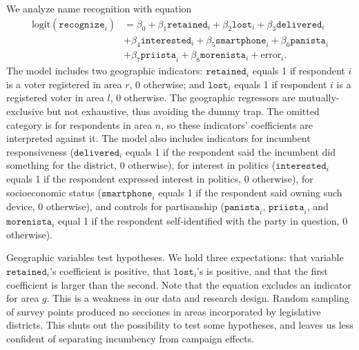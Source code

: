 \documentclass[letter,12pt]{article}
\begin{document}
We analyze name recognition with equation
\begin{equation}
  \begin{split}
\text{logit}(\texttt{recognize}_i) & =    \beta_0
                                       + \beta_1\texttt{retained}_i
                                       + \beta_2\texttt{lost}_i
                                       + \beta_3\texttt{delivered}_i \\
                                     & + \beta_4\texttt{interested}_i
                                       + \beta_5\texttt{smartphone}_i 
                                       + \beta_6\texttt{panista}_i \\
                                     & + \beta_7\texttt{priista}_i
                                       + \beta_8\texttt{morenista}_i
                                       + \text{error}_i.
  \end{split}
\end{equation}
The model includes two geographic indicators: $\texttt{retained}_i$ equals 1 if respondent $i$ is a voter registered in area $r$, 0 otherwise; and $\texttt{lost}_i$ equals 1 if respondent $i$ is a registered voter in area $l$, 0 otherwise. The geographic regressors are mutually-exclusive but not exhaustive, thus avoiding the dummy trap. The omitted category is for respondents in area $n$, so these indicators' coefficients are interpreted against it. The model also includes indicators for incumbent responsiveness ($\texttt{delivered}_i$ equals 1 if the respondent said the incumbent did something for the district, 0 otherwise), for interest in politics ($\texttt{interested}_i$ equals 1 if the respondent expressed interest in politics, 0 otherwise), for socioeconomic status ($\texttt{smartphone}_i$ equals 1 if the respondent said owning such device, 0 otherwise), and controls for partisanship ($\texttt{panista}_i$, $\texttt{priista}_i$, and $\texttt{morenista}_i$ equal 1 if the respondent self-identified with the party in question, 0 otherwise).

Geographic variables test hypotheses. We hold three expectations: that variable $\texttt{retained}_i$'s coefficient is positive, that $\texttt{lost}_i$'s is positive, and that the first coefficient is larger than the second. Note that the equation excludes an indicator for area $g$. This is a weakness in our data and research design. Random sampling of survey points produced no secciones in areas incorporated by legislative districts. This shuts out the possibility to test some hypotheses, and leaves us less confident of separating incumbency from campaign effects.
\end{document}
